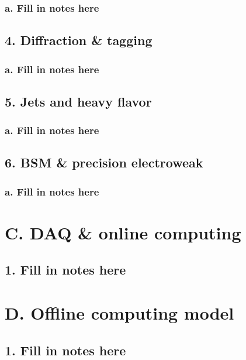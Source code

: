 \documentclass{report}
\begin{document}
\subsubsection{a. Fill in notes here}
\subsection{4. Diffraction \& tagging}
\subsubsection{a. Fill in notes here}
\subsection{5. Jets and heavy flavor}
\subsubsection{a. Fill in notes here}
\subsection{6. BSM \& precision electroweak}
\subsubsection{a. Fill in notes here}
%
\section{C. DAQ & online computing}
\subsection{1. Fill in notes here}
%
\section{D. Offline computing model}
\subsection{1. Fill in notes here}
\end{document}
